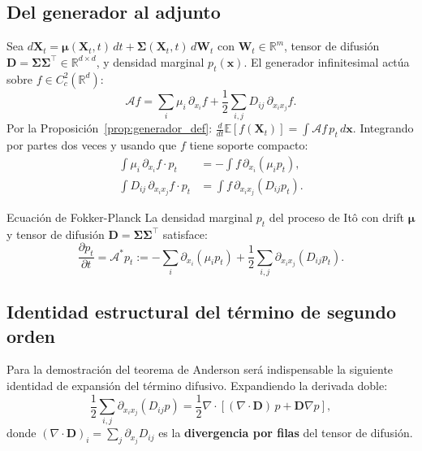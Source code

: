 \subsection{Del generador al adjunto}
\label{subsec:fp_derivacion}

Sea $d\bm{X}_t = \bm{\mu}(\bm{X}_t,t)\,dt + \bm{\Sigma}(\bm{X}_t,t)\,d\bm{W}_t$
con $\bm{W}_t \in \mathbb{R}^m$, tensor de difusión $\bm{D} =
\bm{\Sigma}\bm{\Sigma}^\top \in \mathbb{R}^{d\times d}$, y densidad marginal
$p_t(\bm{x})$. El generador infinitesimal actúa sobre $f \in C_c^2(\mathbb{R}^d)$:
\[
  \mathcal{A}f = \sum_i \mu_i\,\partial_{x_i}f
  + \frac{1}{2}\sum_{i,j} D_{ij}\,\partial_{x_i x_j}f.
\]
Por la Proposición~\ref{prop:generador_def}:
$\frac{d}{dt}\mathbb{E}[f(\bm{X}_t)] = \int \mathcal{A}f\,p_t\,d\bm{x}$.
Integrando por partes dos veces y usando que $f$ tiene soporte compacto:
\begin{align*}
  \int \mu_i\,\partial_{x_i}f\cdot p_t &= -\int f\,\partial_{x_i}(\mu_i p_t),\\
  \int D_{ij}\,\partial_{x_ix_j}f\cdot p_t &= \int f\,\partial_{x_ix_j}(D_{ij}p_t).
\end{align*}

\begin{teorema}{Ecuación de Fokker-Planck}
\label{thm:fokker_planck}
La densidad marginal $p_t$ del proceso de Itô con drift $\bm{\mu}$ y tensor de
difusión $\bm{D} = \bm{\Sigma}\bm{\Sigma}^\top$ satisface:
\begin{equation}
  \frac{\partial p_t}{\partial t}
  = \mathcal{A}^* p_t
  := -\sum_i \partial_{x_i}(\mu_i p_t)
  + \frac{1}{2}\sum_{i,j}\partial_{x_i x_j}(D_{ij}p_t).
  \label{eq:fp}
\end{equation}
\end{teorema}

\subsection{Identidad estructural del término de segundo orden}
\label{subsec:fp_identidad}

Para la demostración del teorema de Anderson será indispensable la siguiente
identidad de expansión del término difusivo. Expandiendo la derivada doble:
\begin{equation}
  \frac{1}{2}\sum_{i,j}\partial_{x_ix_j}(D_{ij}p)
  = \frac{1}{2}\nabla\cdot\!\left[(\nabla\cdot\bm{D})\,p
  + \bm{D}\nabla p\right],
  \label{eq:identidad_difusiva}
\end{equation}
donde $(\nabla\cdot\bm{D})_i = \sum_j\partial_{x_j}D_{ij}$ es la
\textbf{divergencia por filas} del tensor de difusión.

